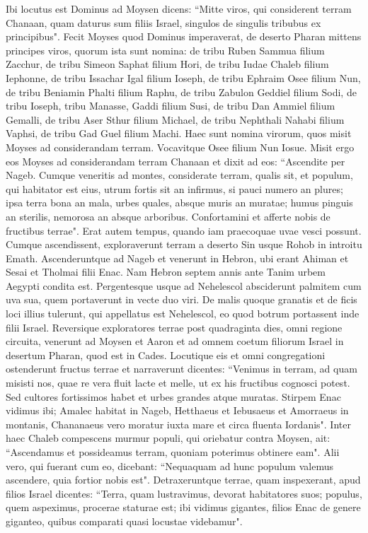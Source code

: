 \begin{biblechapter}  
\verse Ibi locutus est Dominus ad Moysen dicens: 
\verse “Mitte viros, qui considerent terram Chanaan, quam daturus sum filiis Israel, singulos de singulis tribubus ex principibus". 
\verse Fecit Moyses quod Dominus imperaverat, de deserto Pharan mittens principes viros, quorum ista sunt nomina: 
\verse de tribu Ruben Sammua filium Zacchur,  
\verse de tribu Simeon Saphat filium Hori, 
\verse de tribu Iudae Chaleb filium Iephonne, 
\verse de tribu Issachar Igal filium Ioseph, 
\verse de tribu Ephraim Osee filium Nun, 
\verse de tribu Beniamin Phalti filium Raphu, 
\verse de tribu Zabulon Geddiel filium Sodi, 
\verse de tribu Ioseph, tribu Manasse, Gaddi filium Susi, 
\verse de tribu Dan Ammiel filium Gemalli, 
\verse de tribu Aser Sthur filium Michael, 
\verse de tribu Nephthali Nahabi filium Vaphsi, 
\verse de tribu Gad Guel filium Machi. 
\verse Haec sunt nomina virorum, quos misit Moyses ad considerandam terram. Vocavitque Osee filium Nun Iosue. 
\verse Misit ergo eos Moyses ad considerandam terram Chanaan et dixit ad eos: “Ascendite per Nageb. Cumque veneritis ad montes, 
\verse considerate terram, qualis sit, et populum, qui habitator est eius, utrum fortis sit an infirmus, si pauci numero an plures; 
\verse ipsa terra bona an mala, urbes quales, absque muris an muratae; 
\verse humus pinguis an sterilis, nemorosa an absque arboribus. Confortamini et afferte nobis de fructibus terrae". Erat autem tempus, quando iam praecoquae uvae vesci possunt. 
\verse Cumque ascendissent, exploraverunt terram a deserto Sin usque Rohob in introitu Emath. 
\verse Ascenderuntque ad Nageb et venerunt in Hebron, ubi erant Ahiman et Sesai et Tholmai filii Enac. Nam Hebron septem annis ante Tanim urbem Aegypti condita est. 
\verse Pergentesque usque ad Nehelescol absciderunt palmitem cum uva sua, quem portaverunt in vecte duo viri. De malis quoque granatis et de ficis loci illius tulerunt, 
\verse qui appellatus est Nehelescol, eo quod botrum portassent inde filii Israel. 
\verse Reversique exploratores terrae post quadraginta dies, omni regione circuita, 
\verse venerunt ad Moysen et Aaron et ad omnem coetum filiorum Israel in desertum Pharan, quod est in Cades. Locutique eis et omni congregationi ostenderunt fructus terrae 
\verse et narraverunt dicentes: “Venimus in terram, ad quam misisti nos, quae re vera fluit lacte et melle, ut ex his fructibus cognosci potest. 
\verse Sed cultores fortissimos habet et urbes grandes atque muratas. Stirpem Enac vidimus ibi;  
\verse Amalec habitat in Nageb, Hetthaeus et Iebusaeus et Amorraeus in montanis, Chananaeus vero moratur iuxta mare et circa fluenta Iordanis". 
\verse Inter haec Chaleb compescens murmur populi, qui oriebatur contra Moysen, ait: “Ascendamus et possideamus terram, quoniam poterimus obtinere eam". 
\verse Alii vero, qui fuerant cum eo, dicebant: “Nequaquam ad hunc populum valemus ascendere, quia fortior nobis est". 
\verse Detraxeruntque terrae, quam inspexerant, apud filios Israel dicentes: “Terra, quam lustravimus, devorat habitatores suos; populus, quem aspeximus, procerae staturae est; 
\verse ibi vidimus gigantes, filios Enac de genere giganteo, quibus comparati quasi locustae videbamur". 
\end{biblechapter}

